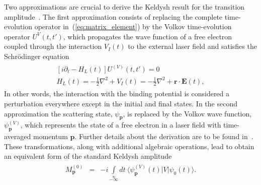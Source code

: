 Two approximations are crucial to derive the Keldysh result for the
transition amplitude~\cite{Kopold_1997sfa}. The first approximation
consists of replacing the complete time-evolution operator
in~(\ref{eq:matrix_element}) by the Volkov time-evolution operator
$U^{V}(t,t')$, which propagates the wave function of a free electron
coupled through the interaction $V_{I}(t)$ to the external laser
field and satisfies the Schr\"{o}dinger equation
%
\begin{eqnarray}
  \label{eq:Uv_SchEq}
  \begin{split}
    [ i\partial_{t} - H_{L}(t) ] U^{(V)}(t,t') = 0 \\
    H_{L}(t) = -\frac{1}{2} \nabla^{2} + V_{I}(t) =
    -\frac{1}{2} \nabla^{2} + \mathbf{r} \cdot \mathbf{E}(t),
  \end{split}
\end{eqnarray}
%
In other words, the interaction with the binding potential is
considered a perturbation everywhere except in the initial and final
states. In the second approximation the scattering state,
$\psi_{\mathbf{p}}$, is replaced by the Volkov wave function,
$\psi_{\mathbf{p}}^{(V)}$, which represents the state of a free
electron in a laser field with time-averaged momentum
$\mathbf{p}$. Further details about the derivation are to be found
in~\cite{Kopold_1997sfa}. These transformations, along with additional
algebraic operations, lead to obtain an equivalent form of the
standard Keldysh amplitude~\cite{Kopold_1997sfa, Becker_1997}
\begin{eqnarray}
\label{eq:keldysh_amp}
\begin{split}
M_{\mathbf{p}}^{(0)} & = &
-i \int\limits_{-\infty}\limits^{\infty}
dt\ \langle \psi_{\mathbf{p}}^{(V)}(t) | V | \psi_{0}(t) \rangle.
\end{split}
\end{eqnarray}

